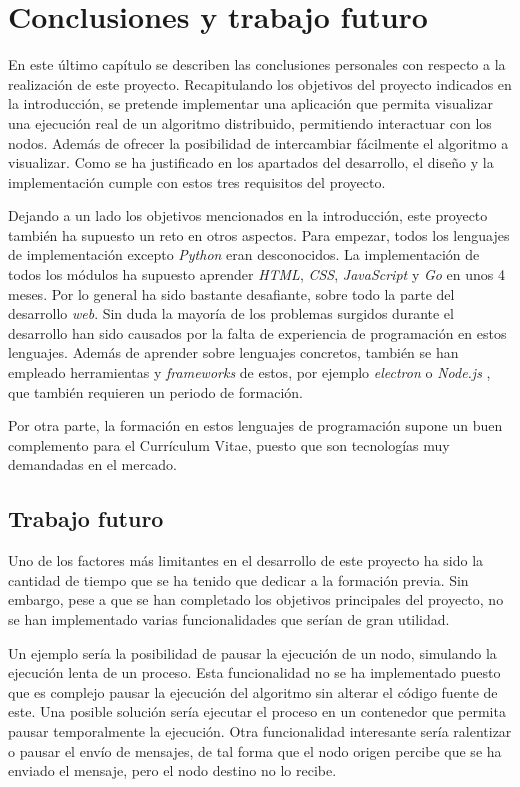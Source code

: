 \chapter{Conclusiones y trabajo futuro}

En este último capítulo se describen las conclusiones personales con respecto a la realización de este proyecto. Recapitulando los objetivos del proyecto indicados en la introducción, se pretende implementar una aplicación que permita visualizar una ejecución real de un algoritmo distribuido, permitiendo interactuar con los nodos. Además de ofrecer la posibilidad de intercambiar fácilmente el algoritmo a visualizar. Como se ha justificado en los apartados del desarrollo, el diseño y la implementación cumple con estos tres requisitos del proyecto.

Dejando a un lado los objetivos mencionados en la introducción, este proyecto también ha supuesto un reto en otros aspectos. Para empezar, todos los lenguajes de implementación excepto \textit{Python} eran desconocidos. La implementación de todos los módulos ha supuesto aprender \textit{HTML}, \textit{CSS}, \textit{JavaScript} y \textit{Go} en unos 4 meses. Por lo general ha sido bastante desafiante, sobre todo la parte del desarrollo \textit{web}. Sin duda la mayoría de los problemas surgidos durante el desarrollo han sido causados por la falta de experiencia de programación en estos lenguajes. Además de aprender sobre lenguajes concretos, también se han empleado herramientas y \textit{frameworks} de estos, por ejemplo \textit{electron} \cite{electron} o \textit{Node.js} \cite{nodejs}, que también requieren un periodo de formación.

Por otra parte, la formación en estos lenguajes de programación supone un buen complemento para el Currículum Vitae, puesto que son tecnologías muy demandadas en el mercado. 

\section{Trabajo futuro}

Uno de los factores más limitantes en el desarrollo de este proyecto ha sido la cantidad de tiempo que se ha tenido que dedicar a la formación previa. Sin embargo, pese a que se han completado los objetivos principales del proyecto, no se han implementado varias funcionalidades que serían de gran utilidad.

Un ejemplo sería la posibilidad de pausar la ejecución de un nodo, simulando la ejecución lenta de un proceso. Esta funcionalidad no se ha implementado puesto que es complejo pausar la ejecución del algoritmo sin alterar el código fuente de este. Una posible solución sería ejecutar el proceso en un contenedor que permita pausar temporalmente la ejecución. Otra funcionalidad interesante sería ralentizar o pausar el envío de mensajes, de tal forma que el nodo origen percibe que se ha enviado el mensaje, pero el nodo destino no lo recibe.

